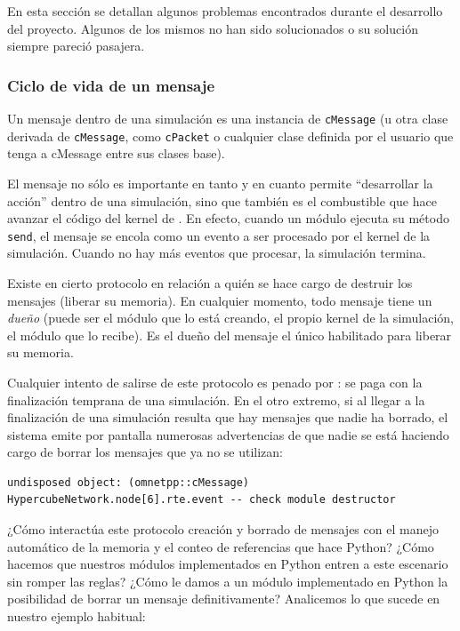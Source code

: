 \documentclass[]{article}
\begin{document}
En esta sección se detallan algunos problemas encontrados durante el desarrollo
del proyecto. Algunos de los mismos no han sido solucionados o su solución
siempre pareció pasajera.

\subsubsection{Ciclo de vida de un mensaje}

Un mensaje dentro de una simulación \omnetpp{} es una instancia de \verb!cMessage!
(u otra clase derivada de \verb!cMessage!, como \verb!cPacket! o cualquier
clase definida por el usuario que tenga a cMessage entre sus clases base).

El mensaje no sólo es importante en tanto y en cuanto permite ``desarrollar la
acción'' dentro de una simulación, sino que también es el combustible que hace
avanzar el código del kernel de \omnetpp{}. En efecto, cuando un módulo ejecuta
su método \verb!send!, el mensaje se encola como un evento a ser procesado por
el kernel de la simulación. Cuando no hay más eventos que procesar, la
simulación termina.

Existe en \omnetpp{} cierto protocolo en relación a quién se hace cargo de
destruir los mensajes (liberar su memoria). En cualquier momento, todo mensaje
tiene un \textit{dueño} (puede ser el módulo que lo está creando, el propio
kernel de la simulación, el módulo que lo recibe). Es el dueño del mensaje el
único habilitado para liberar su memoria.

Cualquier intento de salirse de este protocolo es penado por \omnetpp{}: se paga
con la finalización temprana de una simulación. En el otro extremo, si al
llegar a la finalización de una simulación resulta que hay mensajes que nadie
ha borrado, el sistema emite por pantalla numerosas advertencias de que nadie
se está haciendo cargo de borrar los mensajes que ya no se utilizan:

\begin{verbatim}
undisposed object: (omnetpp::cMessage) HypercubeNetwork.node[6].rte.event -- check module destructor
\end{verbatim}

¿Cómo interactúa este protocolo creación y borrado de mensajes con el manejo
automático de la memoria y el conteo de referencias que hace Python? ¿Cómo
hacemos que nuestros módulos implementados en Python entren a este escenario
sin romper las reglas? ¿Cómo le damos a un módulo implementado en Python la
posibilidad de borrar un mensaje definitivamente? Analicemos lo que sucede en
nuestro ejemplo habitual:
\end{document}
